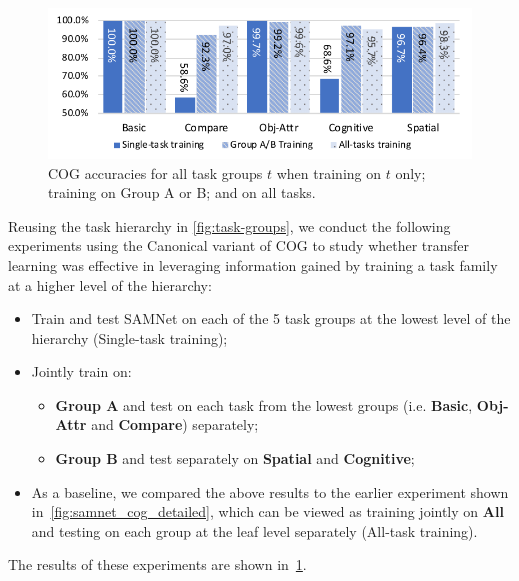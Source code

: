\begin{figure}[htbp]
	\centering
	\includegraphics[width=\columnwidth]{../img/plots/cog_reasoning_transfer.pdf}
	\caption{COG accuracies for all task groups $t$ when training on $t$ only; training on Group A or B; and on all tasks.}
	\label{fig:COG-reasoning-results}
\end{figure}\vspace{2pt}

Reusing the task hierarchy in \cref{fig:task-groups}, we conduct the following experiments using the Canonical variant of COG to study whether transfer learning was effective in leveraging information gained by training a task family at a higher level
of the hierarchy:
 \begin{itemize}
 	\compresslist
	\item Train and test SAMNet on each of the 5 task groups at the lowest level of the hierarchy (Single-task training);
	\item Jointly train on:
	\begin{itemize}
		\item \textbf{Group A} and test on each task from the lowest groups (i.e. \textbf{Basic}, \textbf{Obj-Attr} and \textbf{Compare}) separately;
		\item \textbf{Group B} and test separately on \textbf{Spatial} and \textbf{Cognitive};
	\end{itemize}
	\item As a baseline, we compared the above results to the earlier experiment shown in~\cref{fig:samnet_cog_detailed}, which can be viewed as training jointly on \textbf{All} and testing on each group at the leaf level separately (All-task training).
\end{itemize}

The results of these experiments are shown in~\cref{fig:COG-reasoning-results}.

